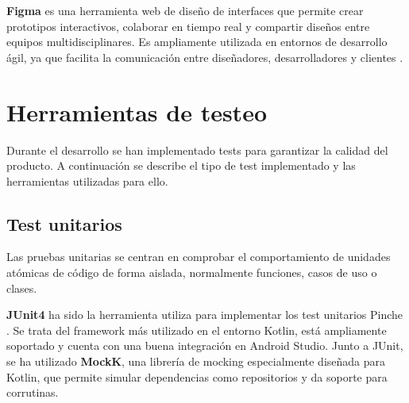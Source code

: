 \textbf{Figma} es una herramienta web de diseño de interfaces que permite crear prototipos interactivos, colaborar en tiempo real y compartir diseños entre equipos multidisciplinares. Es ampliamente utilizada en entornos de desarrollo ágil, ya que facilita la comunicación entre diseñadores, desarrolladores y clientes \cite{figma}.

\section{Herramientas de testeo}
\label{sec:test-tools}
Durante el desarrollo se han implementado tests para garantizar la calidad del producto. A continuación se describe el tipo de test implementado y las herramientas utilizadas para ello.

\subsection{Test unitarios}

Las pruebas unitarias se centran en comprobar el comportamiento de unidades atómicas de código de forma aislada, normalmente funciones, casos de uso o clases.

\textbf{JUnit4} ha sido la herramienta utiliza para implementar los test unitarios Pinche \cite{android-testing}. Se trata del framework más utilizado en el entorno Kotlin, está ampliamente soportado y cuenta con una buena integración en Android Studio. Junto a JUnit, se ha utilizado \textbf{MockK}, una librería de mocking especialmente diseñada para Kotlin, que permite simular dependencias como repositorios y da soporte para corrutinas.
